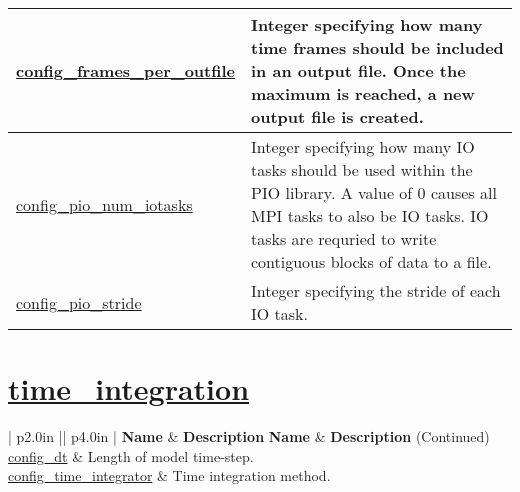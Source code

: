 {\begin{center}
\begin{longtable}{| p{2.0in} || p{4.0in} |}
	\hline
	\hyperref[subsec:nm_sec_config_frames_per_outfile]{config\_frames\_per\_outfile} & Integer specifying how many time frames should be included in an output file. Once the maximum is reached, a new output file is created. \\
	\hline
	\hyperref[subsec:nm_sec_config_pio_num_iotasks]{config\_pio\_num\_iotasks} & Integer specifying how many IO tasks should be used within the PIO library. A value of 0 causes all MPI tasks to also be IO tasks. IO tasks are requried to write contiguous blocks of data to a file. \\
	\hline
	\hyperref[subsec:nm_sec_config_pio_stride]{config\_pio\_stride} & Integer specifying the stride of each IO task. \\
	\hline
\end{longtable}
\end{center}
}
\section[time\_integration]{\hyperref[sec:nm_sec_time_integration]{time\_integration}}
\label{sec:nm_tab_time_integration}

\vspace{0.5in}
{\small
\begin{center}
\begin{longtable}{| p{2.0in} || p{4.0in} |}
	\hline
	{\bf Name} & {\bf Description} \endfirsthead
	\hline 
	{\bf Name} & {\bf Description} (Continued) \endhead
	\hline
	\hline
	\hyperref[subsec:nm_sec_config_dt]{config\_dt} & Length of model time-step. \\
	\hline
	\hyperref[subsec:nm_sec_config_time_integrator]{config\_time\_integrator} & Time integration method. \\
	\hline
\end{longtable}
\end{center}
}
